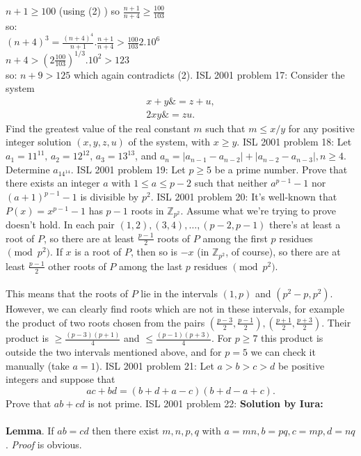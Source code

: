 $n+1\geq 100$ (using (2) ) so $\frac{n+1}{n+4}\geq \frac{100}{103}$ \\
so: \\
$(n+4)^3=\frac{(n+4)^4}{n+1}.\frac{n+1}{n+4}>\frac{100}{103}2.10^6$ \\
$n+4>\left(2\frac{100}{103}\right)^{1/3}.10^2>123$ \\
so: $n+9>125$ which again contradicts (2). 
ISL 2001 problem 17:  Consider the system
\begin{align*}x + y  \&= z + u,\\2xy \& = zu.\end{align*}
Find the greatest value of the real constant $m$ such that $m \leq x/y$ for any positive integer solution $(x,y,z,u)$ of the system, with $x \geq y$. 
ISL 2001 problem 18:  Let $ a_1 = 11^{11}, \, a_2 = 12^{12}, \, a_3 = 13^{13}$, and $ a_n = |a_{n - 1} - a_{n - 2}| + |a_{n - 2} - a_{n - 3}|, n \geq 4.$ Determine $ a_{14^{14}}$. 
ISL 2001 problem 19:  Let $p \geq 5$ be a prime number. Prove that there exists an integer $a$ with $1 \leq a \leq p-2$ such that neither $a^{p-1}-1$ nor $(a+1)^{p-1}-1$ is divisible by $p^2$. 
ISL 2001 problem 20:  It's well-known that $P(x)=x^{p-1}-1$ has $p-1$ roots in $\mathbb Z_{p^2}$. Assume what we're trying to prove doesn't hold. In each pair $(1,2),(3,4),\ldots,(p-2,p-1)$ there's at least a root of $P$, so there are at least $\frac{p-1}2$ roots of $P$ among the first $p$ residues $\pmod{p^2}$. If $x$ is a root of $P$, then so is $-x$ (in $\mathbb Z_{p^2}$, of course), so there are at least $\frac{p-1}2$ other roots of $P$ among the last $p$ residues $\pmod{p^2}$. \\\\
This means that the roots of $P$ lie in the intervals $(1,p)$ and $(p^2-p,p^2)$. However, we can clearly find roots which are not in these intervals, for example the product of two roots chosen from the pairs $(\frac{p-3}2,\frac{p-1}2),(\frac{p+1}2,\frac{p+3}2)$. Their product is $\ge \frac{(p-3)(p+1)}4$ and $\le \frac{(p-1)(p+3)}4$. For $p\ge 7$ this product is outside the two intervals mentioned above, and for $p=5$ we can check it manually (take $a=1$). 
ISL 2001 problem 21:  Let $a > b > c > d$ be positive integers and suppose that
\[ ac + bd = (b+d+a-c)(b+d-a+c). \]
Prove that $ab + cd$ is not prime. 
ISL 2001 problem 22:  \textbf{Solution by Iura:} \\\\
\textbf{Lemma}. If $ab=cd$ then there exist $m,n,p,q$ with $a=mn, b=pq, c=mp, d=nq$. \textit{Proof} is obvious. \\\\
